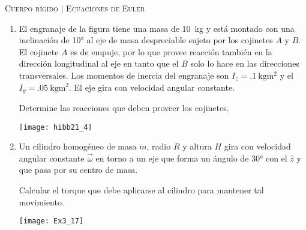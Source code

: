 \documentclass[11pt, spanish, a4paper, twoside]{article}
\begin{document}
\begin{center}
  \textsc{\large Cuerpo rígido | Ecuaciones de Euler}
\end{center}


\begin{enumerate}


\item 
\begin{minipage}[t][3.5cm]{0.65\textwidth}
El engranaje de la figura tiene una masa de \SI{10}{\kilo\gram} y está montado con una inclinación de \ang{10;;} al eje de masa despreciable sujeto por los cojinetes \(A\) y \(B\).
El cojinete \(A\) es de empuje, por lo que provee reacción también en la dirección longitudinal al eje en tanto que el \(B\) solo lo hace en las direcciones transversales.
Los momentos de inercia del engranaje son \(I_z = \SI{.1}{\kilo\gram\metre\squared}\) y el \(I_y = \SI{.05}{\kilo\gram\metre\squared}\).
El eje gira con velocidad angular constante.
\begin{tasks} 
	\task Determine las reacciones que deben proveer los cojinetes.
\end{tasks}
\end{minipage}
\begin{minipage}[c][1cm][t]{0.3\textwidth}
	\texttt{[image: hibb21\_4]}
\end{minipage}




\item 
\begin{minipage}[t][3.5cm]{0.75\textwidth}
Un cilindro homogéneo de masa \(m\), radio \(R\) y altura \(H\) gira con velocidad angular constante \(\vec{\omega}\) en torno a un eje que forma un ángulo de \ang{30;;} con el \(\hat{z}\) y que pasa por su centro de masa. 
\begin{tasks} 
	\task Calcular el torque que debe aplicarse al cilindro para mantener tal movimiento.
\end{tasks}
\end{minipage}
\begin{minipage}[c][2cm][t]{0.2\textwidth}
	\texttt{[image: Ex3\_17]}
\end{minipage}





\end{enumerate}
\end{document}
